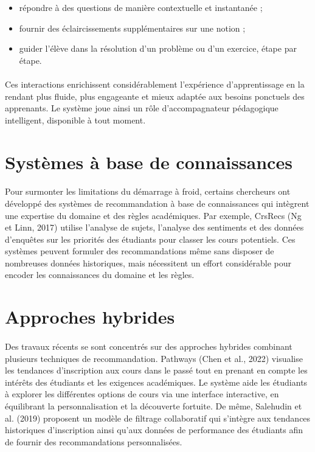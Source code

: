 \begin{itemize}
  \item répondre à des questions de manière contextuelle et instantanée ;
  \item fournir des éclaircissements supplémentaires sur une notion ;
  \item guider l’élève dans la résolution d’un problème ou d’un exercice, étape par étape.
\end{itemize}

\paragraph{} 
Ces interactions enrichissent considérablement l’expérience d’apprentissage en la rendant plus fluide, plus engageante et mieux adaptée aux besoins ponctuels des apprenants. Le système joue ainsi un rôle d’accompagnateur pédagogique intelligent, disponible à tout moment.

\section{Systèmes à base de connaissances}
\paragraph{} 
Pour surmonter les limitations du démarrage à froid, certains chercheurs ont développé des systèmes de recommandation à base de connaissances qui intègrent une expertise du domaine et des règles académiques. Par exemple, CrsRecs (Ng et Linn, 2017) utilise l'analyse de sujets, l'analyse des sentiments et des données d'enquêtes sur les priorités des étudiants pour classer les cours potentiels. Ces systèmes peuvent formuler des recommandations même sans disposer de nombreuses données historiques, mais nécessitent un effort considérable pour encoder les connaissances du domaine et les règles.

\section{Approches hybrides}
\paragraph{} 
Des travaux récents se sont concentrés sur des approches hybrides combinant plusieurs techniques de recommandation. Pathways (Chen et al., 2022) visualise les tendances d’inscription aux cours dans le passé tout en prenant en compte les intérêts des étudiants et les exigences académiques. Le système aide les étudiants à explorer les différentes options de cours via une interface interactive, en équilibrant la personnalisation et la découverte fortuite. De même, Salehudin et al. (2019) proposent un modèle de filtrage collaboratif qui s’intègre aux tendances historiques d’inscription ainsi qu’aux données de performance des étudiants afin de fournir des recommandations personnalisées.

